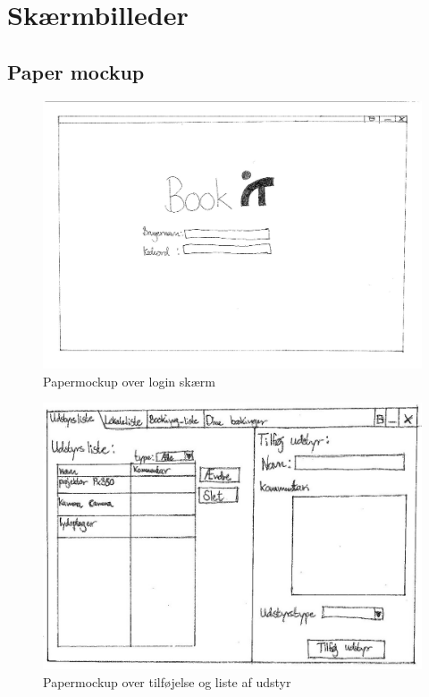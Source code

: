 \chapter{Skærmbilleder}
\label{App_GUI}

\minilof

\section{Paper mockup}
\label{App_GUI_paper}

\begin{figure}[h!]
  \centering
    \includegraphics[angle=90, height=0.75\textheight]{Appendix/GUI-Prototype/PaperMockup/LogIn_001}
  \caption{Papermockup over login skærm}
\label{App_GUI_paper_LogIn}
\end{figure}

\begin{figure}[h!]
  \centering
    \includegraphics[angle=90, height=0.9\textheight]{Appendix/GUI-Prototype/PaperMockup/UdstyrsListe}
  \caption{Papermockup over tilføjelse og liste af udstyr}
\label{App_GUI_paper_UdstyrsListe}
\end{figure}

